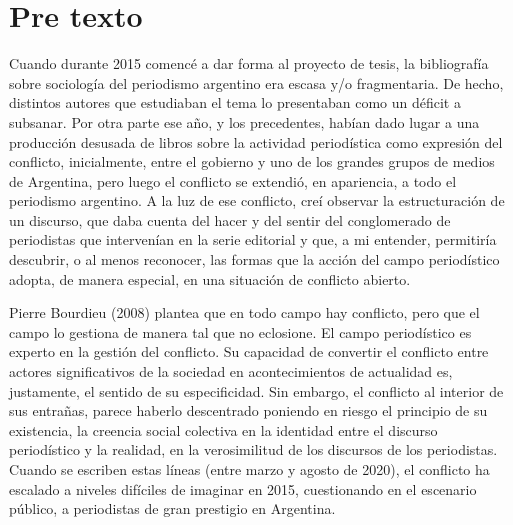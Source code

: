 %
%
%
%
%
%
%
%
%
%


\chapter{Pre texto}

Cuando durante 2015 comencé a dar forma al proyecto de tesis, la bibliografía sobre sociología del periodismo argentino era escasa y/o fragmentaria. De hecho, distintos autores que estudiaban el tema lo presentaban como un déficit a subsanar. Por otra parte ese año, y los precedentes, habían dado lugar a una producción desusada de libros sobre la actividad periodística como expresión del conflicto, inicialmente, entre el gobierno y uno de los grandes grupos de medios de Argentina, pero luego el conflicto se extendió, en apariencia, a todo el periodismo argentino. A la luz de ese conflicto, creí observar la estructuración de un discurso, que daba cuenta del hacer y del sentir del conglomerado de periodistas que intervenían en la serie editorial y que, a mi entender, permitiría descubrir, o al menos reconocer, las formas que la acción del campo periodístico adopta, de manera especial, en una situación de conflicto abierto.

Pierre Bourdieu (2008) plantea que en todo campo hay conflicto, pero que el campo lo gestiona de manera tal que no eclosione. El campo periodístico es experto en la gestión del conflicto. Su capacidad de convertir el conflicto entre actores significativos de la sociedad en acontecimientos de actualidad es, justamente, el sentido de su especificidad. Sin embargo, el conflicto al interior de sus entrañas, parece haberlo descentrado poniendo en riesgo el principio de su existencia, la creencia social colectiva en la identidad entre el discurso periodístico y la realidad, en la verosimilitud de los discursos de los periodistas. Cuando se escriben estas líneas (entre marzo y agosto de 2020), el conflicto ha escalado a niveles difíciles de imaginar en 2015, cuestionando en el escenario público, a periodistas de gran prestigio en Argentina.

